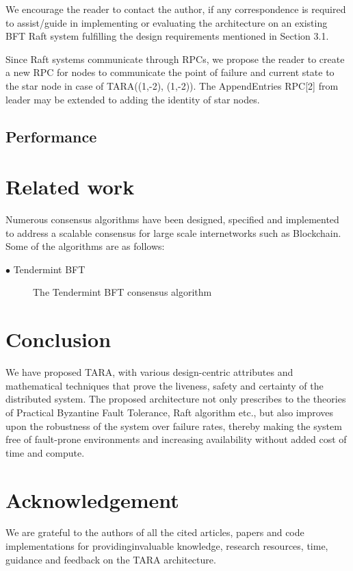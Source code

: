 \documentclass[]{article}
\begin{document}
We encourage the reader to contact the author, if any correspondence is required to assist/guide in implementing or evaluating the architecture on an existing BFT Raft system fulfilling the design requirements mentioned in Section 3.1.

Since Raft systems communicate through RPCs, we propose the reader to create a new RPC for nodes to communicate the point of failure and current state to the star node in case of TARA((1,-2), (1,-2)). The AppendEntries RPC[2] from leader may be extended to adding the identity of star nodes.

\subsection{Performance}

\section{Related work}
Numerous consensus algorithms have been designed, specified and implemented to address a scalable consensus for large scale internetworks such as Blockchain. Some of the algorithms are as follows:
\begin{description}
	\item[$\bullet$ Tendermint BFT] The Tendermint BFT consensus algorithm
\end{description}

\section{Conclusion}
We have proposed TARA, with various design-centric attributes and mathematical techniques that prove the liveness, safety and certainty of the distributed system. The proposed architecture not only prescribes to the theories of Practical Byzantine Fault Tolerance, Raft algorithm etc., but also improves upon the robustness of the system over failure rates, thereby making the system free of fault-prone environments and increasing availability without added cost of time and compute.

\section{Acknowledgement}
We are grateful to the authors of all the cited articles, papers and code implementations for providinginvaluable knowledge, research resources, time, guidance and feedback on the TARA architecture.

 

\end{document}
